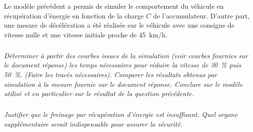 \documentclass[10pt,fleqn]{article} %
\begin{document}
\begin{multicols}{2}
Le modèle précédent a permis de simuler le comportement du véhicule en récupération d’énergie en fonction de la charge $C$ de l’accumulateur. D’autre part, une mesure de décélération a été réalisée sur le véhicule avec une consigne de vitesse nulle et une vitesse initiale proche de \SI{45}{km/h}.

\subparagraph{}
\textit{Déterminer à partir des courbes issues de la simulation (voir courbes fournies sur le document réponse) les temps nécessaires pour réduire la vitesse de 30\, \% puis 50\, \%. (Faire les tracés nécessaires). Comparer les résultats obtenus par simulation à la mesure fournie sur le document réponse. Conclure sur le modèle utilisé et en particulier sur le résultat de la question précédente.}
\ifprof
\begin{corrige}
\end{corrige}
\else
\fi



\subparagraph{}
\textit{Justifier que le freinage par récupération d’énergie est insuffisant. Quel organe supplémentaire
serait indispensable pour assurer la sécurité.}
\ifprof
\begin{corrige}
\end{corrige}
\else
\fi


\end{multicols}
%
%
%
%
%


%
%
%
%
%
%
%
\end{document}
